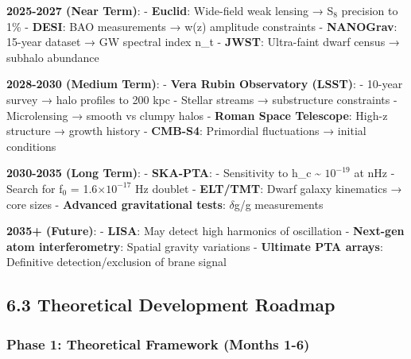 \documentclass[
  11pt,
]{report}
\begin{document}
\textbf{2025-2027 (Near Term)}: - \textbf{Euclid}: Wide-field weak
lensing → S\(_8\) precision to 1\% - \textbf{DESI}: BAO measurements →
w(z) amplitude constraints - \textbf{NANOGrav}: 15-year dataset → GW
spectral index n\_t - \textbf{JWST}: Ultra-faint dwarf census → subhalo
abundance

\textbf{2028-2030 (Medium Term)}: - \textbf{Vera Rubin Observatory
(LSST)}: - 10-year survey → halo profiles to 200 kpc - Stellar streams →
substructure constraints - Microlensing → smooth vs clumpy halos -
\textbf{Roman Space Telescope}: High-z structure → growth history -
\textbf{CMB-S4}: Primordial fluctuations → initial conditions

\textbf{2030-2035 (Long Term)}: - \textbf{SKA-PTA}: - Sensitivity to
h\_c \textasciitilde{} \(10^{-19}\) at nHz - Search for f\(_0\) =
1.6\(\times 10^{-17}\) Hz doublet - \textbf{ELT/TMT}: Dwarf galaxy
kinematics → core sizes - \textbf{Advanced gravitational tests}:
\(\delta\)g/g measurements

\textbf{2035+ (Future)}: - \textbf{LISA}: May detect high harmonics of
oscillation - \textbf{Next-gen atom interferometry}: Spatial gravity
variations - \textbf{Ultimate PTA arrays}: Definitive
detection/exclusion of brane signal

\subsection{6.3 Theoretical Development
Roadmap}\label{theoretical-development-roadmap}

\subsubsection{Phase 1: Theoretical Framework (Months
1-6)}\label{phase-1-theoretical-framework-months-1-6}
\end{document}
